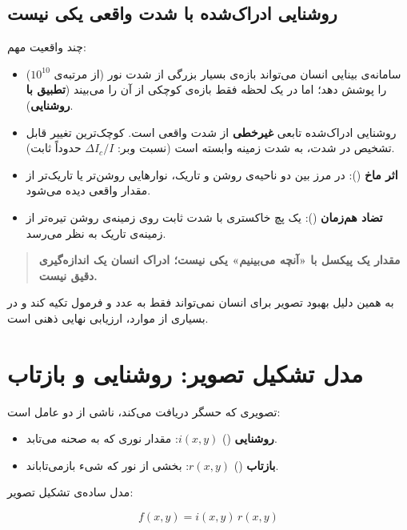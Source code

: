 \documentclass[11pt,a4paper]{article}
\begin{document}
	\subsection{روشنایی ادراک‌شده با شدت واقعی یکی نیست}
	
	چند واقعیت مهم:
	
	\begin{itemize}
		\item سامانه‌ی بینایی انسان می‌تواند بازه‌ی بسیار بزرگی از شدت نور (از مرتبه‌ی $10^{10}$) را پوشش دهد؛
		اما در یک لحظه فقط بازه‌ی کوچکی از آن را می‌بیند (\textbf{تطبیق با روشنایی}).
		\item روشنایی ادراک‌شده تابعی \textbf{غیرخطی} از شدت واقعی است.
		کوچک‌ترین تغییر قابل تشخیص در شدت، به شدت زمینه وابسته است
		(نسبت وبر: $\Delta I_c/I$ حدوداً ثابت).
		\item \textbf{اثر ماخ} (): در مرز بین دو ناحیه‌ی روشن و تاریک،
		نوارهایی روشن‌تر یا تاریک‌تر از مقدار واقعی دیده می‌شود.
		\item \textbf{تضاد هم‌زمان} (): یک پچ خاکستری با شدت ثابت
		روی زمینه‌ی روشن تیره‌تر از زمینه‌ی تاریک به نظر می‌رسد.
	\end{itemize}
	
	\begin{quote}
		\textbf{مقدار یک پیکسل با «آنچه می‌بینیم» یکی نیست؛
			ادراک انسان یک اندازه‌گیری دقیق نیست.}
	\end{quote}
	
	به همین دلیل بهبود تصویر برای انسان نمی‌تواند فقط به عدد و فرمول تکیه کند
	و در بسیاری از موارد، ارزیابی نهایی ذهنی است.
	
	
	\section{مدل تشکیل تصویر: روشنایی و بازتاب}
	
	تصویری که حسگر دریافت می‌کند، ناشی از دو عامل است:
	
	\begin{itemize}
		\item \textbf{روشنایی} () $i(x,y)$: مقدار نوری که به صحنه می‌تابد.
		\item \textbf{بازتاب} () $r(x,y)$: بخشی از نور که شیء بازمی‌تاباند.
	\end{itemize}
	
	مدل ساده‌ی تشکیل تصویر:
	
	\[
	f(x,y)=i(x,y)\,r(x,y)
	\]
	
\end{document}
